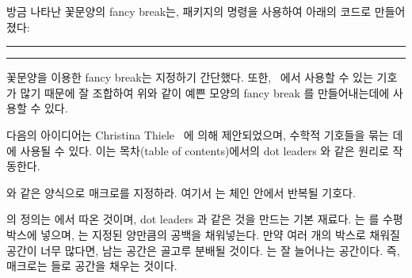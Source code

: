 방금 나타난 꽃문양의 fancy break는,
 패키지의 \cmd{\ding} 명령을 사용하여 아래의 코드로 만들어졌다:
\begin{lcode}
\renewcommand{\pfbreakdisplay}{%
  \ding{167}\quad\ding{167}\quad\ding{167}}
\fancybreak{\pfbreakdisplay}
\end{lcode}

\makeatletter
\newcommand{\motif}[1]{\cleaders\hbox{#1}\hfil}
\newcommand{\chain}[2]{\leavevmode\hbox to #2{\motif{#1}}}
\newcommand{\diamondpattern}{\m@th$\mkern-.6mu \diamond \mkern-.6mu$}
\makeatother

\fancybreak{\chain{\diamondpattern}{0.25\textwidth}}

꽃문양을 이용한 fancy break는 지정하기 간단했다.
또한, \ltx\ 에서 사용할 수 있는 기호가 많기 때문에
잘 조합하여 위와 같이 예쁜 모양의 fancy break 를 만들어내는데에 사용할 수 있다.


다음의 아이디어는 Christina Thiele~\cite{ORNAMENTAL} 에 의해 제안되었으며,
수학적 기호들을 묶는 데에 사용될 수 있다.
이는 목차(table of contents)에서의 dot leaders 와 같은 원리로 작동한다.

 와 같은 양식으로 매크로를 지정하라.
여기서 는 체인 안에서 반복될 기호다.
\begin{lcode}
\newcommand{\motif}[1]{\cleaders\hbox{#1}\hfil}
\end{lcode}
의 정의는 \tx 에서 따온 것이며, dot leaders 과 같은 것을 만드는 기본 재료다.
\cmd{\hbox} 는  를 수평 박스에 넣으며,
\cmd{\cleaders} 는 지정된 양만큼의 공백을 채워넣는다.
만약 여러 개의 박스로 채워질 공간이 너무 많다면,
남는 공간은 골고루 분배될 것이다.
\cmd{\hfil} 는 잘 늘어나는 공간이다. 
즉,  매크로는  들로 공간을 채우는 것이다.

